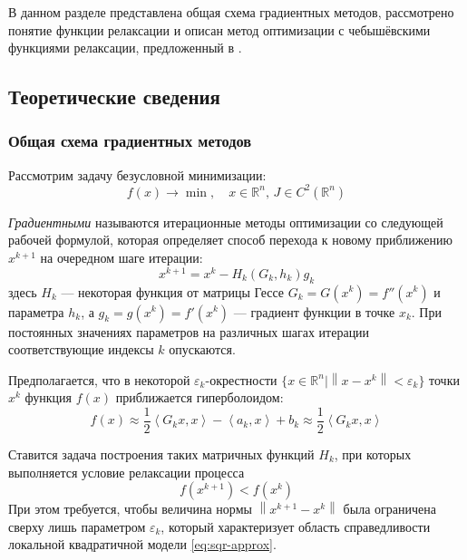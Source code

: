 \documentclass{article}
\renewcommand{\epsilon}{\varepsilon}
\providecommand{\neword}{\emph}
\providecommand{\norm}[1]{\left \lVert{#1}\right \rVert}
\providecommand{\set}[1]{\mathbb{#1}}
\newcommand{\scalmult}[1]{{\left \langle #1 \right \rangle}}
\numberwithin{equation}{section}
\begin{document}
В данном разделе представлена общая схема градиентных методов,
рассмотрено понятие функции релаксации и описан метод оптимизации с
чебышёвскими функциями релаксации, предложенный в
\cite{chernorutsky04}.

\subsection{Теоретические сведения}

\subsubsection{Общая схема градиентных методов}

Рассмотрим задачу безусловной минимизации:
\begin{equation*}
  f(x) \to \min,\quad x \in \set{R}^n,\, J \in C^2(\set{R}^n)
\end{equation*}

\neword{Градиентными} называются итерационные методы оптимизации со
следующей рабочей формулой, которая определяет способ перехода к
новому приближению $x^{k+1}$ на очередном шаге итерации:
\begin{equation}
  \label{eq:grad-methods}
  x^{k+1} = x^k - H_k\left(G_k, h_k\right) g_k
\end{equation}
здесь $H_k$ — некоторая функция от матрицы Гессе $G_k = G(x^k) =
f''(x^k)$ и параметра $h_k$, а $g_k = g(x^k) = f'(x^k)$ — градиент
функции в точке $x_k$. При постоянных значениях параметров на
различных шагах итерации соответствующие индексы $k$ опускаются.

Предполагается, что в некоторой $\epsilon_k$-окрестности $\{x \in
\set{R}^n | \norm{x-x^k} < \epsilon_k\}$ точки $x^k$ функция $f(x)$
приближается гиперболоидом:
\begin{equation}
  \label{eq:sqr-approx}
  f(x) \approx \frac{1}{2}\scalmult{G_k x, x} - \scalmult{a_k,x} + b_k \approx \frac{1}{2}\scalmult{G_k x, x}
\end{equation}

Ставится задача построения таких матричных функций $H_k$, при которых
выполняется условие релаксации процесса
\begin{equation}
  \label{eq:relax-cond}
  f(x^{k+1}) < f(x^k)
\end{equation}
При этом требуется, чтобы величина нормы $\norm{x^{k+1}-x^{k}}$ была
ограничена сверху лишь параметром $\epsilon_k$, который характеризует
область справедливости локальной квадратичной модели
\eqref{eq:sqr-approx}.
\end{document}
